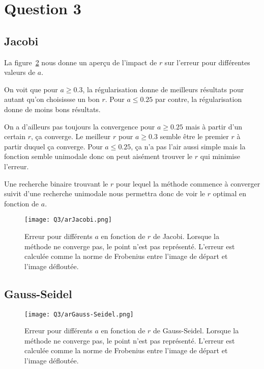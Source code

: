 \section{Question 3}

\subsection{Jacobi}
La figure~\ref{fig:ar} nous donne un aperçu de l'impact de $r$
sur l'erreur pour différentes valeurs de $a$.

On voit que pour $a \geq 0.3$, la régularisation donne de meilleurs résultats
pour autant qu'on choisissse un bon $r$.
Pour $a \leq 0.25$ par contre, la régularisation donne de moins bons résultats.

On a d'ailleurs pas toujours la convergence pour $a \geq 0.25$ mais à partir
d'un certain $r$, ça converge.
Le meilleur $r$ pour $a \geq 0.3$ semble être le premier $r$ à partir duquel
ça converge.
Pour $a \leq 0.25$, ça n'a pas l'air aussi simple mais la fonction semble
unimodale donc on peut aisément trouver le $r$ qui minimise l'erreur.

Une recherche binaire trouvant le $r$ pour lequel la méthode commence à converger
suivit d'une recherche unimodale nous permettra donc de voir le $r$ optimal en
fonction de $a$.

\begin{figure}
  \centering
  \texttt{[image: Q3/arJacobi.png]}
  \caption{Erreur pour différents $a$ en fonction de $r$ de Jacobi.
  Lorsque la méthode ne converge pas, le point n'est pas représenté.
  L'erreur est calculée comme la norme de Frobenius entre l'image de départ
  et l'image défloutée.}
  \label{fig:ar}
\end{figure}

\subsection{Gauss-Seidel}

\begin{figure}
  \centering
  \texttt{[image: Q3/arGauss-Seidel.png]}
  \caption{Erreur pour différents $a$ en fonction de $r$ de Gauss-Seidel.
  Lorsque la méthode ne converge pas, le point n'est pas représenté.
  L'erreur est calculée comme la norme de Frobenius entre l'image de départ
  et l'image défloutée.}
  \label{fig:ar}
\end{figure}

